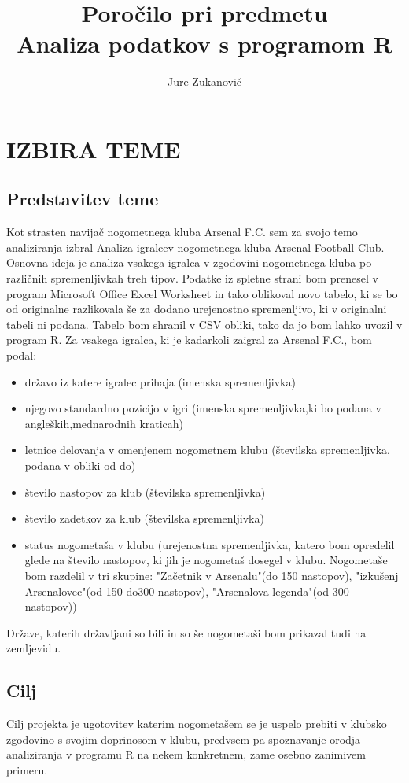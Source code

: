 \documentclass[11pt,a4paper]{article}
\begin{document}
\title{Poročilo pri predmetu \\
Analiza podatkov s programom R}
\author{Jure Zukanovič}
\maketitle

\section{IZBIRA TEME}
\subsection{Predstavitev teme}
Kot strasten navijač nogometnega kluba Arsenal F.C. sem za svojo temo analiziranja izbral Analiza igralcev nogometnega kluba Arsenal Football Club. Osnovna ideja je analiza vsakega igralca v zgodovini nogometnega kluba po različnih spremenljivkah treh tipov. Podatke iz spletne strani bom prenesel v program  Microsoft Office Excel Worksheet in tako oblikoval novo tabelo, ki se bo od originalne razlikovala še za dodano urejenostno spremenljivo, ki v originalni tabeli ni podana. Tabelo bom shranil v CSV obliki, tako da jo bom lahko uvozil v program  R. Za vsakega igralca, ki je kadarkoli zaigral za Arsenal F.C., bom podal: 
\begin{itemize}
\item{državo iz katere igralec prihaja (imenska spremenljivka)}
\item{njegovo standardno pozicijo v igri (imenska spremenljivka,ki bo podana v angleških,mednarodnih kraticah)}
\item{letnice delovanja v omenjenem nogometnem klubu (številska spremenljivka, podana v obliki od-do)}
\item{število nastopov za klub (številska spremenljivka)}
\item{število zadetkov za klub (številska spremenljivka)}
\item{status nogometaša v klubu (urejenostna spremenljivka, katero bom opredelil glede na število nastopov, ki jih je nogometaš dosegel v klubu. Nogometaše bom razdelil v tri skupine: "Začetnik v Arsenalu"(do 150 nastopov), "izkušenj Arsenalovec"(od 150 do300 nastopov), "Arsenalova legenda"(od 300 nastopov))}
\end{itemize}
Države, katerih državljani so bili in so še nogometaši bom prikazal tudi na zemljevidu.

\subsection{Cilj}
Cilj projekta je ugotovitev katerim nogometašem se je uspelo prebiti v klubsko zgodovino s svojim doprinosom v klubu, predvsem pa spoznavanje orodja analiziranja v programu R na nekem konkretnem, zame osebno zanimivem primeru. 
\end{document}
